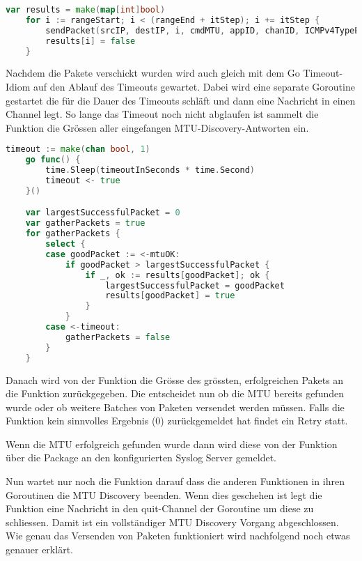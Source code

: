 \begin{lstlisting}[language=go, caption=Ein Batch von Paketen verschicken]                    
	var results = make(map[int]bool)
	for i := rangeStart; i < (rangeEnd + itStep); i += itStep {
		sendPacket(srcIP, destIP, i, cmdMTU, appID, chanID, ICMPv4TypeEchoRequest)
		results[i] = false
	}
\end{lstlisting}

Nachdem die Pakete verschickt wurden wird auch gleich mit dem Go Timeout-Idiom auf den Ablauf des Timeouts gewartet. Dabei wird eine separate Goroutine gestartet die für die Dauer des Timeouts schläft und dann eine Nachricht in einen Channel legt. So lange das Timeout noch nicht abglaufen ist sammelt die  Funktion die Grössen aller eingefangen MTU-Discovery-Antworten ein.

\begin{lstlisting}[language=go, caption=Antworten einsammeln in mtu.sendBatch(..)]    
	timeout := make(chan bool, 1)
	go func() {
		time.Sleep(timeoutInSeconds * time.Second)
		timeout <- true
	}()

	var largestSuccessfulPacket = 0
	var gatherPackets = true
	for gatherPackets {
		select {
		case goodPacket := <-mtuOK:
			if goodPacket > largestSuccessfulPacket {
				if _, ok := results[goodPacket]; ok {
					largestSuccessfulPacket = goodPacket
					results[goodPacket] = true
				}
			}
		case <-timeout:
			gatherPackets = false
		}
	}
\end{lstlisting}

Danach wird von der  Funktion die Grösse des grössten, erfolgreichen Pakets an die  Funktion zurückgegeben. Die  entscheidet nun ob die \ac{MTU} bereits gefunden wurde oder ob weitere Batches von Paketen versendet werden müssen.
Falls die  Funktion kein sinnvolles Ergebnis (0) zurückgemeldet hat findet ein Retry statt.

Wenn die \ac{MTU} erfolgreich gefunden wurde dann wird diese von der  Funktion über die  Package an den konfigurierten Syslog Server gemeldet.

Nun wartet nur noch die  Funktion darauf dass die anderen  Funktionen in ihren Goroutinen die \ac{MTU} Discovery beenden. Wenn dies geschehen ist legt die  Funktion eine Nachricht in den quit-Channel der  Goroutine um diese zu schliessen. Damit ist ein vollständiger \ac{MTU} Discovery Vorgang abgeschlossen. Wie genau das Versenden von Paketen funktioniert wird nachfolgend noch etwas genauer erklärt.





